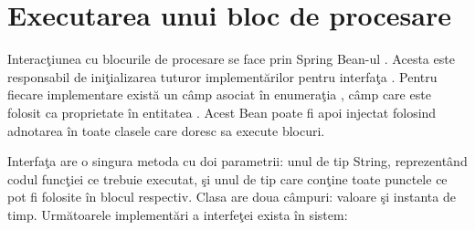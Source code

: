 \section{Executarea unui bloc de procesare}
Interacţiunea cu blocurile de procesare se face prin Spring Bean-ul . Acesta este responsabil de iniţializarea tuturor implementărilor pentru interfaţa . Pentru fiecare implementare există un câmp asociat în enumeraţia , câmp care este folosit ca proprietate în entitatea . Acest Bean poate fi apoi injectat folosind adnotarea  în toate clasele care doresc sa execute blocuri.

Interfaţa  are o singura metoda  cu doi parametrii: unul de tip String, reprezentând codul funcţiei ce trebuie executat, şi unul de tip  care conţine toate punctele ce pot fi folosite în blocul respectiv. Clasa  are doua câmpuri: valoare şi instanta de timp. Următoarele implementări a interfeţei  exista în sistem:
